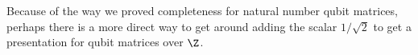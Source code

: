  Because of the way we proved completeness for natural number qubit matrices, perhaps there is a more direct way to get around adding the scalar $1/\sqrt 2$ to get a presentation for qubit matrices over $\Z$.



%
